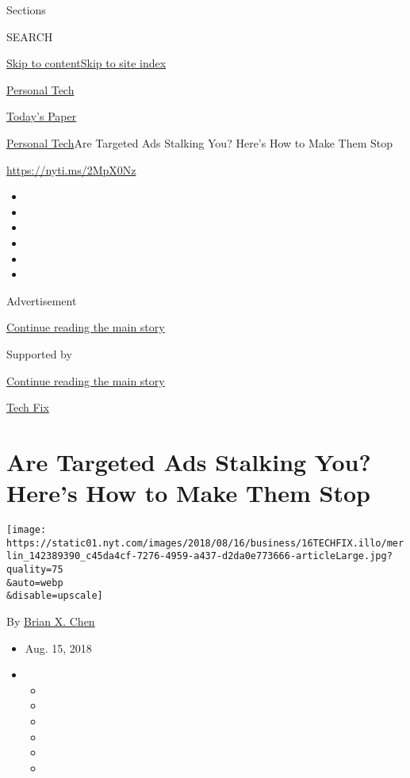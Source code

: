 Sections

SEARCH

\protect\hyperlink{site-content}{Skip to
content}\protect\hyperlink{site-index}{Skip to site index}

\href{https://www.nytimes.com/section/technology/personaltech}{Personal
Tech}

\href{https://myaccount.nytimes.com/auth/login?response_type=cookie\&client_id=vi}{}

\href{https://www.nytimes.com/section/todayspaper}{Today's Paper}

\href{/section/technology/personaltech}{Personal Tech}\textbar{}Are
Targeted Ads Stalking You? Here's How to Make Them Stop

\url{https://nyti.ms/2MpX0Nz}

\begin{itemize}
\item
\item
\item
\item
\item
\item
\end{itemize}

Advertisement

\protect\hyperlink{after-top}{Continue reading the main story}

Supported by

\protect\hyperlink{after-sponsor}{Continue reading the main story}

\href{/column/tech-fix}{Tech Fix}

\hypertarget{are-targeted-ads-stalking-you-heres-how-to-make-them-stop}{%
\section{Are Targeted Ads Stalking You? Here's How to Make Them
Stop}\label{are-targeted-ads-stalking-you-heres-how-to-make-them-stop}}

\texttt{[image: https://static01.nyt.com/images/2018/08/16/business/16TECHFIX.illo/merlin\_142389390\_c45da4cf-7276-4959-a437-d2da0e773666-articleLarge.jpg?quality=75\\\&auto=webp\\\&disable=upscale]}

By \href{http://www.nytimes.com/by/brian-x-chen}{Brian X. Chen}

\begin{itemize}
\item
  Aug. 15, 2018
\item
  \begin{itemize}
  \item
  \item
  \item
  \item
  \item
  \item
  \end{itemize}
\end{itemize}

